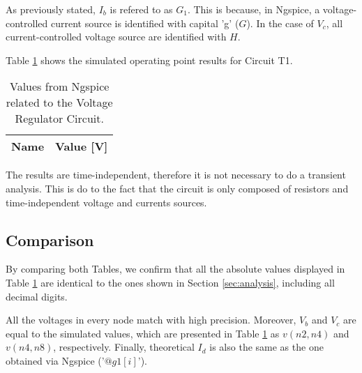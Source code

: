 As previously stated, $I_b$ is refered to as $G_1$. This is because, in Ngspice, a
voltage-controlled current source is identified with capital 'g' ($G$). In the case of
$V_c$, all current-controlled voltage source are identified with $H$.

Table \ref{tab:op} shows the simulated operating point results for Circuit T1.



\begin{table}[h]
	\centering
	\begin{tabular}{|l|r|}
		\hline    
		{\bf Name} & {\bf Value [V]} \\ \hline
    		
	\end{tabular}
	
	\caption{Values from Ngspice related to the Voltage Regulator Circuit.}
    
\label{tab:op}
\end{table}

The results are time-independent, therefore it is not necessary to do a transient analysis.  
This is do to the fact that the circuit is only composed of resistors and time-independent voltage
and currents sources.



\subsection{Comparison}



By comparing both Tables, we confirm that all the absolute values displayed in Table \ref{tab:op}
are identical to the ones shown in Section \ref{sec:analysis}, including all decimal digits.

All the voltages in every node match with high precision. Moreover, $V_b$ and $V_c$ are
equal to the simulated values, which are presented in Table \ref{tab:op} as $v(n2,n4)$ and
$v(n4,n8)$, respectively. Finally, theoretical $I_d$ is also the same as the one obtained
via Ngspice ('$@g1[i]$'). \\

